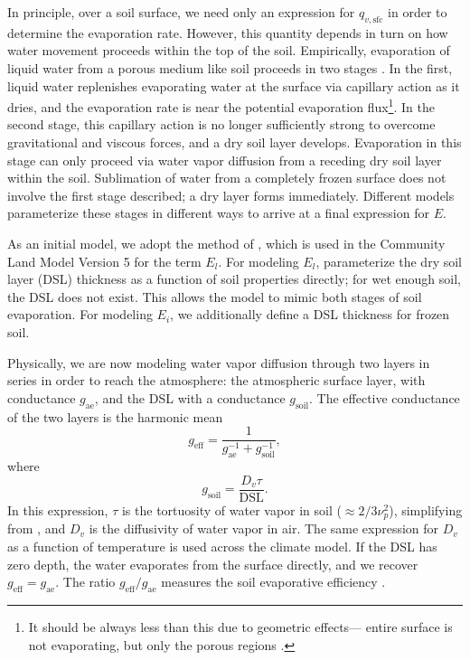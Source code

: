 \documentclass[twoside,10pt]{report}
\begin{document}
In principle, over a soil surface, we need only an expression for $q_{v,\mathrm{sfc}}$ in order to determine the evaporation rate. However, this quantity depends in turn on how water movement proceeds within the top of the soil. Empirically, evaporation of liquid water from a porous medium like soil proceeds in two stages \citep[e.g.][]{Lehmann2008}. In the first, liquid water replenishes evaporating water at the surface via capillary action as it dries, and the evaporation rate is near the potential evaporation flux\footnote{It should be always less than this due to geometric effects--- entire surface is not evaporating, but only the porous regions \citep{Schlunder88}.}. In the second stage, this capillary action is no longer sufficiently strong to overcome gravitational and viscous forces, and a dry soil layer develops. Evaporation in this stage can only proceed via water vapor diffusion from a receding dry soil layer within the soil. Sublimation of water from a completely frozen surface does not involve the first stage described; a dry layer forms immediately. Different models parameterize these stages in different ways to arrive at a final expression for $E$.

As an initial model, we adopt the method of \citet{Swenson12a}, which is used in the Community Land Model Version 5 for the term $E_l$. For modeling $E_l$, \citet{Swenson12a} parameterize the dry soil layer (DSL) thickness as a function of soil properties directly; for wet enough soil, the DSL does not exist. This allows the model to mimic both stages of soil evaporation. For modeling $E_i$, we additionally define a DSL thickness for frozen soil.

Physically, we are now modeling water vapor diffusion through two layers in series in order to reach the atmosphere: the atmospheric surface layer, with conductance $g_{\mathrm{ae}}$, and the DSL with a conductance $g_{\mathrm{soil}}$. The effective conductance of the two layers is the harmonic mean
\begin{equation}
    g_{\mathrm{eff}} = \frac{1}{g_{\mathrm{ae}}^{-1}+g_{\mathrm{soil}}^{-1}},
\end{equation}
where
\begin{equation}\label{e:g_soil}
    g_{\mathrm{soil}} = \frac{D_v \tau}{\mathrm{DSL}}.
\end{equation}
In this expression, $\tau$ is the tortuosity of water vapor in soil ($\approx 2/3\nu_p^2$), simplifying from \citet{Swenson12a}, and $D_v$ is the diffusivity of water vapor in air. The same expression for $D_v$ as a function of temperature is used across the climate model. If the DSL has zero depth, the water evaporates from the surface directly, and we recover $g_{\mathrm{eff}} = g_{\mathrm{ae}}$. The ratio $g_{\mathrm{eff}}/g_{\mathrm{ae}}$ measures the soil evaporative efficiency \citep{Merlin16a}.
\end{document}
